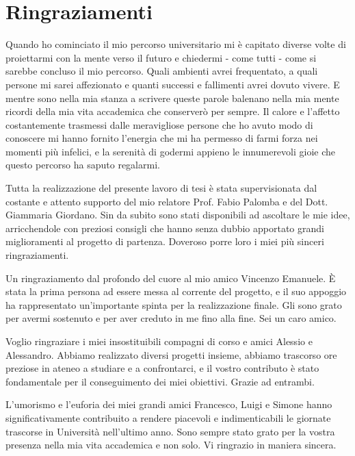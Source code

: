\chapter{Ringraziamenti}

Quando ho cominciato il mio percorso universitario mi è capitato diverse volte di proiettarmi con la mente verso il futuro e chiedermi - come tutti - come si sarebbe concluso il mio percorso. Quali ambienti avrei frequentato, a quali persone mi sarei affezionato e quanti successi e fallimenti avrei dovuto vivere. E mentre sono nella mia stanza a scrivere queste parole balenano nella mia mente ricordi della mia vita accademica che conserverò per sempre. Il calore e l'affetto costantemente trasmessi dalle meravigliose persone che ho avuto modo di conoscere mi hanno fornito l'energia che mi ha permesso di farmi forza nei momenti più infelici, e la serenità di godermi appieno le innumerevoli gioie che questo percorso ha saputo regalarmi. 

Tutta la realizzazione del presente lavoro di tesi è stata supervisionata dal costante e attento supporto del mio relatore Prof. Fabio Palomba e del Dott. Giammaria Giordano. Sin da subito sono stati disponibili ad ascoltare le mie idee, arricchendole con preziosi consigli che hanno senza dubbio apportato grandi miglioramenti al progetto di partenza. Doveroso porre loro i miei più sinceri ringraziamenti. 

Un ringraziamento dal profondo del cuore al mio amico Vincenzo Emanuele. È stata la prima persona ad essere messa al corrente del progetto, e il suo appoggio ha rappresentato un'importante spinta per la realizzazione finale. Gli sono grato per avermi sostenuto e per aver creduto in me fino alla fine. Sei un caro amico.

Voglio ringraziare i miei insostituibili compagni di corso e amici Alessio e Alessandro. Abbiamo realizzato diversi progetti insieme, abbiamo trascorso ore preziose in ateneo a studiare e a confrontarci, e il vostro contributo è stato fondamentale per il conseguimento dei miei obiettivi. Grazie ad entrambi.

L'umorismo e l'euforia dei miei grandi amici Francesco, Luigi e Simone hanno significativamente contribuito a rendere piacevoli e indimenticabili le giornate trascorse in Università nell'ultimo anno. Sono sempre stato grato per la vostra presenza nella mia vita accademica e non solo. Vi ringrazio in maniera sincera. 

